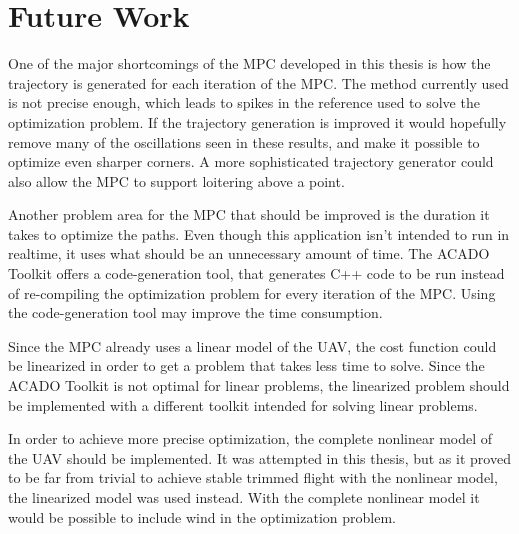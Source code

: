 
\section{Future Work}

One of the major shortcomings of the MPC developed in this thesis is how the trajectory is generated for each iteration of the MPC. The method currently used is not precise enough, which leads to spikes in the reference used to solve the optimization problem. If the trajectory generation is improved it would hopefully remove many of the oscillations seen in these results, and make it possible to optimize even sharper corners. A more sophisticated trajectory generator could also allow the MPC to support loitering above a point.

Another problem area for the MPC that should be improved is the duration it takes to optimize the paths. Even though this application isn't intended to run in realtime, it uses what should be an unnecessary amount of time. The ACADO Toolkit offers a code-generation tool, that generates C++ code to be run instead of re-compiling the optimization problem for every iteration of the MPC. Using the code-generation tool may improve the time consumption.

Since the MPC already uses a linear model of the UAV, the cost function could be linearized in order to get a problem that takes less time to solve. Since the ACADO Toolkit is not optimal for linear problems, the linearized problem should be implemented with a different toolkit intended for solving linear problems.

In order to achieve more precise optimization, the complete nonlinear model of the UAV should be implemented. It was attempted in this thesis, but as it proved to be far from trivial to achieve stable trimmed flight with the nonlinear model, the linearized model was used instead. With the complete nonlinear model it would be possible to include wind in the optimization problem.